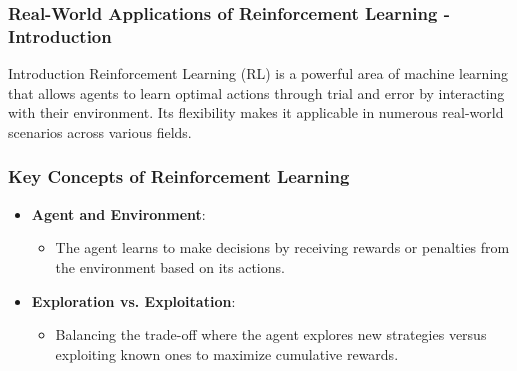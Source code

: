 \documentclass[aspectratio=169]{beamer}
\begin{document}
\begin{frame}[fragile]
    \frametitle{Real-World Applications of Reinforcement Learning - Introduction}
    \begin{block}{Introduction}
        Reinforcement Learning (RL) is a powerful area of machine learning that allows agents to learn optimal actions through trial and error by interacting with their environment. Its flexibility makes it applicable in numerous real-world scenarios across various fields.
    \end{block}
\end{frame}

\begin{frame}[fragile]
    \frametitle{Key Concepts of Reinforcement Learning}
    \begin{itemize}
        \item \textbf{Agent and Environment}:
        \begin{itemize}
            \item The agent learns to make decisions by receiving rewards or penalties from the environment based on its actions.
        \end{itemize}
        \item \textbf{Exploration vs. Exploitation}:
        \begin{itemize}
            \item Balancing the trade-off where the agent explores new strategies versus exploiting known ones to maximize cumulative rewards.
        \end{itemize}
    \end{itemize}
\end{frame}
\end{document}
